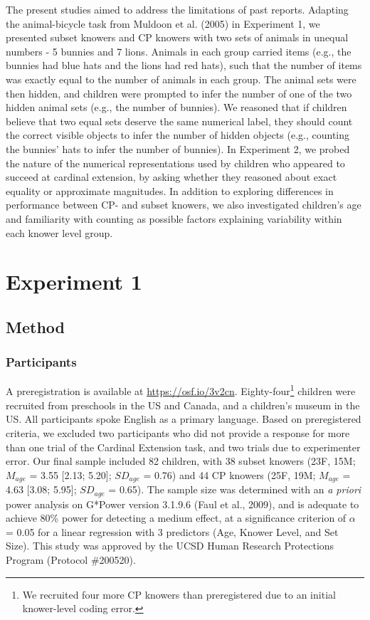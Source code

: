 \documentclass[
  man,floatsintext]{apa7}
\begin{document}
The present studies aimed to address the limitations of past reports. Adapting the animal-bicycle task from Muldoon et al. (2005) in Experiment 1, we presented subset knowers and CP knowers with two sets of animals in unequal numbers - 5 bunnies and 7 lions. Animals in each group carried items (e.g., the bunnies had blue hats and the lions had red hats), such that the number of items was exactly equal to the number of animals in each group. The animal sets were then hidden, and children were prompted to infer the number of one of the two hidden animal sets (e.g., the number of bunnies). We reasoned that if children believe that two equal sets deserve the same numerical label, they should count the correct visible objects to infer the number of hidden objects (e.g., counting the bunnies' hats to infer the number of bunnies). In Experiment 2, we probed the nature of the numerical representations used by children who appeared to succeed at cardinal extension, by asking whether they reasoned about exact equality or approximate magnitudes. In addition to exploring differences in performance between CP- and subset knowers, we also investigated children's age and familiarity with counting as possible factors explaining variability within each knower level group.

\hypertarget{experiment-1}{%
\section{Experiment 1}\label{experiment-1}}

\hypertarget{method}{%
\subsection{Method}\label{method}}

\hypertarget{participants}{%
\subsubsection{Participants}\label{participants}}

A preregistration is available at \url{https://osf.io/3v2cn}.
Eighty-four\footnote{We recruited four more CP knowers than preregistered due to an initial knower-level coding error.} children were recruited from preschools in the US and Canada, and a children's museum in the US.
All participants spoke English as a primary language. Based on preregistered criteria, we excluded two participants who did not provide a response for more than one trial of the Cardinal Extension task, and two trials due to experimenter error. Our final sample included 82 children, with 38 subset knowers (23F, 15M; \(M_{age}\) = 3.55 {[}2.13; 5.20{]}; \(SD_{age}\) = 0.76)
and 44 CP knowers (25F, 19M; \(M_{age}\) = 4.63 {[}3.08; 5.95{]}; \(SD_{age}\) = 0.65). The sample size was determined with an \emph{a priori} power analysis on G*Power version 3.1.9.6 (Faul et al., 2009), and is adequate to achieve 80\% power for detecting a medium effect, at a significance criterion of \(\alpha\) = 0.05 for a linear regression with 3 predictors (Age, Knower Level, and Set Size). This study was approved by the UCSD Human Research Protections Program (Protocol \#200520).
\end{document}
